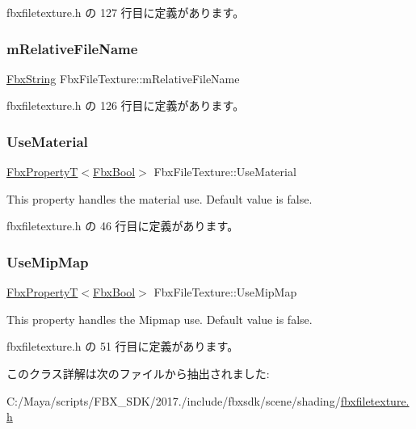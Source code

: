  fbxfiletexture.\+h の 127 行目に定義があります。

\mbox{\label{class_fbx_file_texture_ab42081ef2be0913cc666b9aca03c7373}} 
\subsubsection{\texorpdfstring{m\+Relative\+File\+Name}{mRelativeFileName}}
{\footnotesize\ttfamily \hyperlink{class_fbx_string}{Fbx\+String} Fbx\+File\+Texture\+::m\+Relative\+File\+Name\hspace{0.3cm}{\ttfamily [protected]}}



 fbxfiletexture.\+h の 126 行目に定義があります。

\mbox{\label{class_fbx_file_texture_a404cc00d81d3645071cb475b0b822c59}} 
\subsubsection{\texorpdfstring{Use\+Material}{UseMaterial}}
{\footnotesize\ttfamily \hyperlink{class_fbx_property_t}{Fbx\+PropertyT}$<$\hyperlink{fbxtypes_8h_a92e0562b2fe33e76a242f498b362262e}{Fbx\+Bool}$>$ Fbx\+File\+Texture\+::\+Use\+Material}

This property handles the material use. Default value is false. 

 fbxfiletexture.\+h の 46 行目に定義があります。

\mbox{\label{class_fbx_file_texture_ab7dd18dfbaf20ce668f5443ac7b5d2ec}} 
\subsubsection{\texorpdfstring{Use\+Mip\+Map}{UseMipMap}}
{\footnotesize\ttfamily \hyperlink{class_fbx_property_t}{Fbx\+PropertyT}$<$\hyperlink{fbxtypes_8h_a92e0562b2fe33e76a242f498b362262e}{Fbx\+Bool}$>$ Fbx\+File\+Texture\+::\+Use\+Mip\+Map}

This property handles the Mipmap use. Default value is false. 

 fbxfiletexture.\+h の 51 行目に定義があります。



このクラス詳解は次のファイルから抽出されました\+:\begin{DoxyCompactItemize}
\item 
C\+:/\+Maya/scripts/\+F\+B\+X\+\_\+\+S\+D\+K/2017./include/fbxsdk/scene/shading/\hyperlink{fbxfiletexture_8h}{fbxfiletexture.\+h}\end{DoxyCompactItemize}

